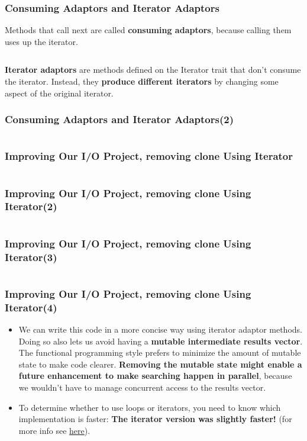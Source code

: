 \documentclass{beamer}
\begin{document}
\begin{frame}[fragile]
	\frametitle{Consuming Adaptors and Iterator Adaptors}
	Methods that call next are called \textbf{consuming adaptors}, because calling them uses up the iterator. 
	
		\inputminted[fontsize=\scriptsize]{rust}{./code/iterator4.rs}
		
		
		\textbf{Iterator adaptors }are methods defined on the Iterator trait that don’t consume the iterator. Instead, they \textbf{produce different iterators} by changing some aspect of the original iterator.
\end{frame}

\begin{frame}[fragile]
	\frametitle{Consuming Adaptors and Iterator Adaptors(2)}

	\inputminted{rust}{./code/iterator5.rs}
	
\end{frame}

\begin{frame}[fragile]
	\frametitle{Improving Our I/O Project, removing clone Using Iterator}
	
	\inputminted{rust}{./code/iterator6.rs}
	
\end{frame}

\begin{frame}[fragile]
	\frametitle{Improving Our I/O Project, removing clone Using Iterator(2)}
	
	\inputminted[fontsize=\scriptsize]{rust}{./code/iterator7.rs}
	
\end{frame}
 
 \begin{frame}[fragile]
 	\frametitle{Improving Our I/O Project, removing clone Using Iterator(3)}
 	
 	\inputminted[fontsize=\scriptsize]{rust}{./code/iterator8.rs}
 	
 \end{frame}

 \begin{frame}[fragile]
	\frametitle{Improving Our I/O Project, removing clone Using Iterator(4)}
	\begin{itemize}
		\item We can write this code in a more concise way using iterator adaptor methods. Doing so also lets us avoid having a \textbf{mutable intermediate results vector}. The functional programming style prefers to minimize the amount of mutable state to make code clearer. \textbf{Removing the mutable state might enable a future enhancement to make searching happen in parallel}, because we wouldn’t have to manage concurrent access to the results vector. 
		\item 	To determine whether to use loops or iterators, you need to know which implementation is faster: \textbf{The iterator version was slightly faster! }(for more info see \href{https://doc.rust-lang.org/book/ch13-04-performance.html}{here}).
	\end{itemize}
\end{frame}
\end{document}
